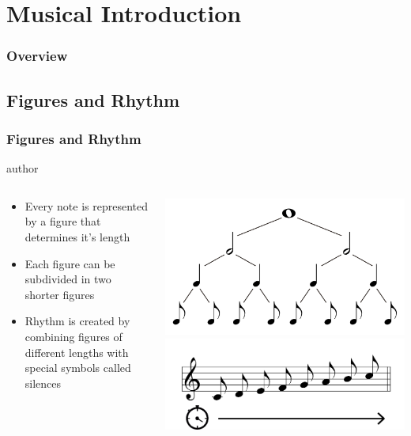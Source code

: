 \documentclass[english,fragile]{beamer}
\begin{document}
\section{Musical Introduction}
\begin{frame}
	\frametitle{Overview}
\end{frame}
\subsection{Figures and Rhythm}
	\begin{frame}
		\frametitle{Figures and Rhythm}
		\begin{beamercolorbox}[leftskip=8cm,center,wd=0.7\textwidth]{author}
		\begin{columns}[T]
		\begin{column}{.60\textwidth}%
		\begin{itemize}
			\item Every note is represented by a \alert{figure} that determines it's \alert{length}
			\item Each figure can be \alert{subdivided in two} shorter figures
			\item \alert{Rhythm} is created by \alert{combining figures} of different lengths with special symbols called silences
		\end{itemize}
		\end{column}
		\begin{column}{.39\textwidth}%
		\includegraphics[width=\linewidth]{imagenes/music_tree.pdf} \\
		\includegraphics[width=\linewidth]{imagenes/C_scale_time.png}
		\end{column}
		\end{columns}
		\end{beamercolorbox}
		
\end{frame}
\end{document}
